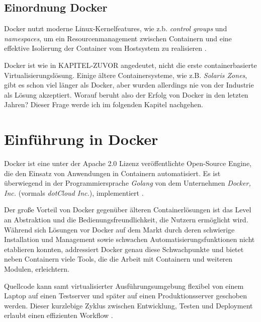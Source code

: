 \documentclass[11pt,a4paper,oneside]{report}
\begin{document}
	  \subsection{Einordnung Docker}
      Docker nutzt moderne Linux-Kernelfeatures, wie z.b. \emph{control groups} und \emph{namespaces}, um ein Resourcenmanagement zwischen Containern und eine effektive Isolierung der Container vom Hostsystem zu realisieren \cite[S.7]{dockerBook}.

      Docker ist wie in KAPITEL-ZUVOR angedeutet, nicht die erste containerbasierte Virtualisierungslösung. Einige ältere Containersysteme, wie z.B. \emph{Solaris Zones}, gibt es schon viel länger als Docker, aber wurden allerdings nie von der Industrie als Lösung akzeptiert. Worauf beruht also der Erfolg von Docker in den letzten Jahren? Dieser Frage werde ich im folgenden Kapitel nachgehen.
  \section{Einführung in Docker}
    Docker ist eine unter der Apache 2.0 Lizenz veröffentlichte Open-Source Engine, die den Einsatz von Anwendungen in Containern automatisiert. Es ist überwiegend in der Programmiersprache \emph{Golang} von dem Unternehmen \emph{Docker, Inc.} (vormals \emph{dotCloud Inc.}), implementiert \cite{githubDocker}\cite[S.7]{dockerBook}.



    Der große Vorteil von Docker gegenüber älteren Containerlösungen ist das Level an Abstraktion und die Bedienungsfreundlichkeit, die Nutzern ermöglicht wird. Während sich Lösungen vor Docker auf dem Markt durch deren schwierige Installation und Management sowie schwachen Automatisierungsfunktionen nicht etablieren konnten, addressiert Docker genau diese Schwachpunkte \cite[S.7]{dockerBook} und bietet neben Containern viele Tools, die die Arbeit mit Containern und weiteren Modulen, erleichtern.

    Quellcode kann samt virtualisierter Ausführungsumgebung flexibel von einem Laptop auf einen Testserver und später auf einen Produktionsserver geschoben werden. Dieser kurzlebige Zyklus zwischen Entwicklung, Testen und Deployment erlaubt einen effizienten Workflow \cite[S.8]{dockerBook}.

\end{document}
